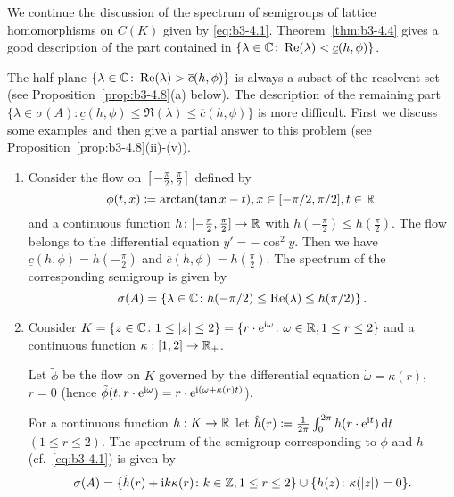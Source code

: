 We continue the discussion of the spectrum of semigroups of lattice homomorphisms on $C(K)$ given by \eqref{eq:b3-4.1}.
Theorem~\ref{thm:b3-4.4} gives a good description of the part contained in $\{\lambda \in \mathbb{C} \colon \mathop{}\!\mathrm{Re}(\lambda) < \underline{c}(h,\phi)\}$.

The half-plane $\{\lambda \in \mathbb{C} \colon \mathop{}\!\mathrm{Re}(\lambda) > \overline{c}(h,\phi)\}$ is always a subset of the resolvent set (see Proposition~\ref{prop:b3-4.8}(a) below).
The description of the remaining part $\{\lambda \in \sigma(A) \colon \underline{c}(h,\phi) \leq \Re(\lambda) \leq \overline{c}(h,\phi)\}$ is more difficult.
First we discuss some examples and then give a partial answer to this problem (see Proposition~\ref{prop:b3-4.8}(ii)-(v)).

\begin{example}\label{ex:b3-4.7}
	\begin{enumerate}[\upshape (i), wide, labelindent=.5em]
		\item 
		Consider the flow on $[-\frac{\pi}{2},\frac{\pi}{2}]$ defined by
		\[
		\phi(t,x)\coloneq \arctan(\tan x - t) , x \in [-{\pi}/{2},{\pi}/{2}], 
		t \in \mathbb{R}\
		\] 
		and a continuous function $h \colon [-\frac{\pi}{2},\frac{\pi}{2}] \to \mathbb{R}$ with $h(-\frac{\pi}{2}) \leq h(\frac{\pi}{2})$. The flow belongs to the differential equation $y' = -\cos^2y$. 
		Then we have $\underline{c}(h,\phi) = h(-\frac{\pi}{2})$ and $\overline{c}(h,\phi) = h(\frac{\pi}{2})$.
		The spectrum of the corresponding semigroup is given by 
		\[
		\sigma(A) = \left\{\lambda \in \mathbb{C} \colon h(-\pi/2) \leq \mathop{}\!\mathrm{Re}(\lambda) \leq h(\pi/2)\right\}.
		\]
		
		\item 
		Consider $K = \{z \in \mathbb{C} \colon 1 \leq |z| \leq 2\} = \{r\cdot \mathrm{e}^{\mathcal{\mathrm{i}\omega}} \colon \omega\in \mathbb{R}, 1 \leq r \leq 2\}$ and a continuous function $\kappa: [1,2] \to \mathbb{R}_+$.
		
		Let $\tilde{\phi}$ be the flow on $K$ governed by the differential equation $\dot{\omega} = \kappa(r)$, $\dot{r} = 0$ (hence $\tilde{\phi}(t,r\cdot \mathrm{e}^{\mathrm{i}\omega}) = r\cdot \mathrm{e}^{\mathrm{i}(\omega + \kappa(r)t)}$).
		
		For a continuous function $h: K \to \mathbb{R}$ let $\hat{h}(r) \coloneq \frac{1}{2\pi}\int_{0}^{2\pi} h(r\cdot \mathrm{e}^{\mathrm{i} t}) \mathop{}\!\mathrm{d}{t}$ $(1 \leq r \leq 2)$.
		The spectrum of the semigroup corresponding to $\phi$ and $h$ (cf.\ \eqref{eq:b3-4.1}) is given by
		\[
		\sigma(A) = \{\hat{h}(r) +  \mathrm{i} k\kappa(r) \colon k \in \mathbb{Z}, 1 \leq r \leq 2\} \cup \{h(z) \colon \kappa(|z|) = 0\}.
		\]
	\end{enumerate}
\end{example}

